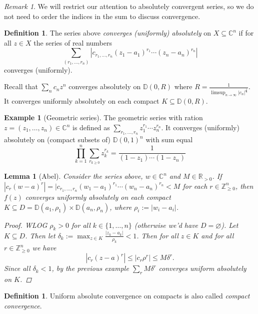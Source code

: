 \documentclass[11pt,A4]{article}
\theoremstyle{plain}
\newtheorem{lm}[thm]{Lemma}
\theoremstyle{definition}
\newtheorem{defn}[thm]{Definition}
\newtheorem{exa}[thm]{Example}
\theoremstyle{remark}
\newtheorem{rem}[thm]{Remark}
\newcommand{\Z}{\mathbb{Z}}
\newcommand{\R}{\mathbb{R}}
\newcommand{\1}{\mathbbm{1}}
\newcommand{\C}{\mathbb{C}}
\newcommand{\bbD}{\mathbb{D}}
\begin{document}
\begin{rem}
    We will restrict our attention to absolutely convergent series, so we do not need to order the indices in the sum to discuss convergence.
\end{rem}

\begin{defn}
    The series above \textit{converges (uniformly) absolutely} on $X\subseteq \C^{n}$ if for all $z\in X$ the series of real numbers
    \[\sum_{(r_{1},\ldots,r_{n})} |c_{r_{1},\ldots,r_{n}}(z_{1}-a_{1})^{r_{1}}\cdots (z_{n}-a_{n})^{r_{n}}| \]
    converges (uniformly).
\end{defn}

Recall that $\sum_{n}c_{n}z^{n}$ converges absolutely on $\bbD(0,R)$ where $R=\frac{1}{\operatorname{limsup}_{n\to\infty}{|c_{n}|^{\frac{1}{n}}}}$.
It converges uniformly absolutely on each compact $K\subseteq \bbD(0,R)$.

\begin{exa}[Geometric series]
    The geometric series with ration $z=(z_{1},\ldots,z_{n})\in \C^{n}$ is defined as $\sum_{r_{1},\ldots,r_{n}}z_{1}^{r_{1}}\cdots z_{n}^{r_{n}}$.
    It converges (uniformly) absolutely on (compact subsets of) $\bbD(0,1)^{n}$ with sum equal
    \[ \prod_{k=1}^{n}\sum_{r_{k\geqslant 0}}z_{k}^{r_{k}}=\frac{1}{(1-z_{1})\cdots (1-z_{n})} \]
\end{exa}

\begin{lm}[Abel]
    Consider the series above, $w\in \C^{n}$ and $M\in \R_{>0}$.
    If $|c_{r}(w-a)^{r}|=|c_{r_{1},\ldots,r_{n}}(w_{1}-a_{1})^{r_{1}}\cdots (w_{n}-a_{n})^{r_{n}}<M$ for each $r\in \Z^{n}_{\geqslant 0}$, then $f(z)$ converges uniformly absolutely on each compact $K\subseteq D=\bbD(a_{1},\rho_{1})\times \bbD(a_{n},\rho_{n})$, where $\rho_{i}:=|w_{i}-a_{i}|$.
    \begin{proof}
	WLOG $\rho_{k}>0$ for all $k\in \{1,\ldots,n\}$ (otherwise we'd have $D=\varnothing$).
	Let $K\subseteq D$.
	Then let $\delta_{k}:=\max_{z\in K}\frac{|z_{k}-a_{k}|}{\rho_{k}}<1 $.
	Then for all $z\in K$ and for all $r\in \Z^{n}_{\geqslant 0}$ we have
	\[ |c_{r}(z-a)^{r}|\leqslant |c_{r}\rho^{r}|\leqslant M\delta^{r}.\]
	Since all $\delta_{k}<1$, by the previous example $\sum_{r}M\delta^{r}$ converges uniform absolutely on $K$.
    \end{proof}
\end{lm}

\begin{defn}
    Uniform absolute convergence on compacts is also called \textit{compact convergence}.
\end{defn}
\end{document}
